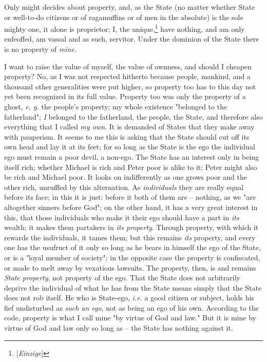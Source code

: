 Only might decides about property, and, as the State (no matter whether State 
or well-to-do citizens or of ragamuffins or of men in the absolute) is the 
sole mighty one, it alone is proprietor; I, the 
unique,\footnote{[\textit{Einzige}]} have nothing, and am only enfeoffed, am 
vassal and as such, servitor. Under the dominion of the State there is no 
property of \textit{mine}.

I want to raise the value of myself, the value of ownness, and should I 
cheapen property? No, as I was not respected hitherto because people, mankind, 
and a thousand other generalities were put higher, so property too has to this 
day not yet been recognized in its full value. Property too was only the 
property of a ghost, \textit{e. g.} the people's property; my whole existence 
"{}belonged to the fatherland"{}; \textit{I} belonged to the fatherland, the 
people, the State, and therefore also everything that I called \textit{my 
own}. It is demanded of States that they make away with pauperism. It seems to 
me this is asking that the State should cut off its own head and lay it at its 
feet; for so long as the State is the ego the individual ego must remain a 
poor devil, a non-ego. The State has an interest only in being itself rich; 
whether Michael is rich and Peter poor is alike to it; Peter might also be 
rich and Michael poor. It looks on indifferently as one grows poor and the 
other rich, unruffled by this alternation. As \textit{individuals} they are 
really equal before its face; in this it is just: before it both of them are 
-- nothing, as we "{}are altogether sinners before God"{}; on the other hand, 
it has a very great interest in this, that those individuals who make it their 
ego should have a part in \textit{its} wealth; it makes them partakers in 
\textit{its property}. Through property, with which it rewards the 
individuals, it tames them; but this remains \textit{its} property, and every 
one has the usufruct of it only so long as he bears in himself the ego of the 
State, or is a "{}loyal member of society"{}; in the opposite case the 
property is confiscated, or made to melt away by vexatious lawsuits. The 
property, then, is and remains \textit{State property}, not property of the 
ego. That the State does not arbitrarily deprive the individual of what he has 
from the State means simply that the State does not rob itself. He who is 
State-ego, \textit{i.e.} a good citizen or subject, holds his fief undisturbed 
as \textit{such an ego}, not as being an ego of his own. According to the 
code, property is what I call mine "{}by virtue of God and law."{} But it is 
mine by virtue of God and law only so long as -- the State has nothing against 
it.

